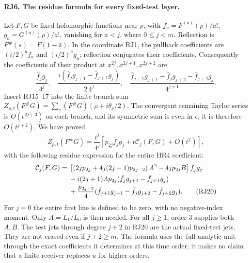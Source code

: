 \paragraph{RJ6. The residue formula for every fixed-test layer.}
Let $F,G$ be fixed holomorphic functions near $\rho$, with
$f_a=F^{(a)}(\rho)/a!$, $g_a=G^{(a)}(\rho)/a!$, vanishing for
$a<j$, where $0\le j<m$. Reflection is
$F^\#(s)=\overline{F(1-\bar s)}$. In the coordinate RJ1, the
pullback coefficients are $(i/2)^a f_a$ and $(i/2)^a g_a$;
reflection conjugates their coefficients. Consequently the
coefficients of their product at $x^{2j},x^{2j+1},x^{2j+2}$ are
\[
 \frac{\bar f_jg_j}{4^j},\quad
 \frac{i(\bar f_jg_{j+1}-\bar f_{j+1}g_j)}{2\,4^j},\quad
 \frac{\bar f_{j+1}g_{j+1}-\bar f_jg_{j+2}-\bar f_{j+2}g_j}{4^{j+1}}.
 \tag{RJ18}
\]
Insert RJ15--17 into the finite branch sum
$Z_{\rho,t}(F^\#G)=\sum_\nu(F^\#G)(\rho+i\theta_\nu/2)$.
The convergent remaining Taylor series is $O(\epsilon^{2j+3})$
on each branch, and its symmetric sum is even in $\epsilon$;
it is therefore $O(t^{j+2})$. We have proved
\[
 Z_{\rho,t}(F^\#G)=\frac{t^j}{4^j}
       \left[p_{2j}\bar f_jg_j+t\mathcal C_j(F,G)+O(t^2)\right],
 \tag{RJ19}
\]
with the following residue expression for the entire HR4 coefficient:
\begin{align}
 \mathcal C_j(F,G)={}&
 \left[\left(2j p_{2j}+4j(2j-1)p_{2j-2}\right)A^2
                         -4j p_{2j}B\right]\bar f_jg_j\notag\\
 &-i(2j+1)A p_{2j}
            (\bar f_jg_{j+1}-\bar f_{j+1}g_j)\notag\\
 &+\frac{p_{2j+2}}4
       (\bar f_{j+1}g_{j+1}-\bar f_jg_{j+2}-\bar f_{j+2}g_j).
 \tag{RJ20}
\end{align}
For $j=0$ the entire first line is defined to be zero, with no
negative-index moment. Only $A=L_1/L_0$ is then needed.
For all $j\ge1$, order $3$ supplies both $A,B$. The test jets
through degree $j+2$ in RJ20 are the actual fixed-test jets. They
are not erased even if $j+2\ge m$. The formula uses the full
analytic unit through the exact coefficients it determines at this
time order; it makes no claim that a finite receiver replaces $u$
for higher orders.

